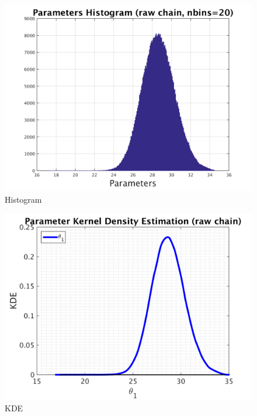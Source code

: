 \begin{figure}[H]
  
  \centering
   \includegraphics[scale=0.75]{53_results/output_50/simple_ip_hist_raw}
   \caption{Histogram}
\end{figure}



\begin{figure}[H]
  
  \centering
   \includegraphics[scale=0.75]{53_results/output_50/simple_ip_kde_raw}
   \caption{ KDE }
\end{figure}

